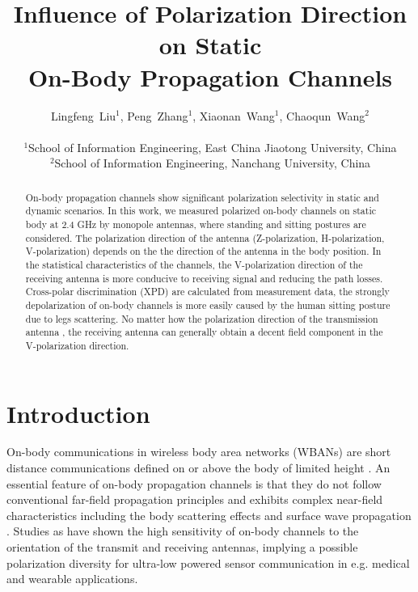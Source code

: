 \documentclass[conference]{IEEEtran}
\begin{document}
\title{Influence of Polarization Direction on Static \\ On-Body Propagation Channels}
\author{Lingfeng~Liu$^1$, Peng~Zhang$^1$, Xiaonan~Wang$^1$, Chaoqun~Wang$^2$\\
\\
$^1$School of Information Engineering, East China Jiaotong University, China \\
$^2$School of Information Engineering,  Nanchang University, China}

\maketitle
\begin{abstract}
On-body propagation channels show significant polarization selectivity in static and dynamic scenarios. In this work, we measured polarized on-body channels on static body at 2.4 GHz by monopole antennas, where standing and sitting postures are considered. The polarization direction of the antenna (Z-polarization, H-polarization, V-polarization) depends on the the direction of the antenna in the body position. In the statistical characteristics of the channels, the V-polarization direction of the receiving antenna is more conducive to receiving signal and reducing the path losses. Cross-polar discrimination (XPD) are calculated from measurement data, the strongly depolarization of on-body channels is more easily caused by the human sitting posture due to legs scattering. No matter how the polarization direction of the transmission antenna , the receiving antenna can generally obtain a decent field component in the V-polarization direction.
\end{abstract}

\section{Introduction}
On-body communications in wireless body area networks (WBANs) are short distance communications defined on or above the body of limited height \cite{1}. An essential feature of on-body propagation channels is that they do not follow conventional far-field propagation principles and exhibits complex near-field characteristics including the body scattering effects\cite{2,3} and surface wave propagation \cite{5}. Studies as \cite{6} have shown the high sensitivity of on-body channels to the orientation of the transmit and receiving antennas, implying a possible polarization diversity for ultra-low powered sensor communication in e.g. medical and wearable applications.
\end{document}
